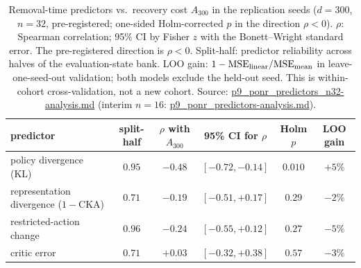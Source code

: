 \documentclass[10pt]{article} %
\begin{document}
\begin{table}[t]
\centering
\caption{Removal-time predictors vs.\ recovery cost $A_{300}$ in the replication seeds ($d=300$, $n=32$, pre-registered; one-sided Holm-corrected $p$ in the direction $\rho<0$). $\rho$: Spearman correlation; 95\% CI by Fisher $z$ with the Bonett--Wright standard error. The pre-registered direction is $\rho<0$. Split-half: predictor reliability across halves of the evaluation-state bank. LOO gain: $1-\mathrm{MSE}_{\rm linear}/\mathrm{MSE}_{\rm mean}$ in leave-one-seed-out validation; both models exclude the held-out seed. This is within-cohort cross-validation, not a new cohort. Source: \url{p9_ponr_predictors_n32-analysis.md} (interim $n=16$: \url{p9_ponr_predictors-analysis.md}).}
\label{tab:predictors}
\small
\begin{tabular}{lccccc}
\toprule
predictor & split-half & $\rho$ with $A_{300}$ & 95\% CI for $\rho$ & Holm $p$ & LOO gain \\
\midrule
policy divergence (KL) & $0.95$ & $\mathbf{-0.48}$ & $[-0.72,-0.14]$ & $\mathbf{0.010}$ & $+5\%$ \\
representation divergence ($1-$CKA) & $0.71$ & $-0.19$ & $[-0.51,+0.17]$ & $0.29$ & $-2\%$ \\
restricted-action change & $0.96$ & $-0.24$ & $[-0.55,+0.12]$ & $0.27$ & $-5\%$ \\
critic error & $0.71$ & $+0.03$ & $[-0.32,+0.38]$ & $0.57$ & $-3\%$ \\
\bottomrule
\end{tabular}
\end{table}
\end{document}
